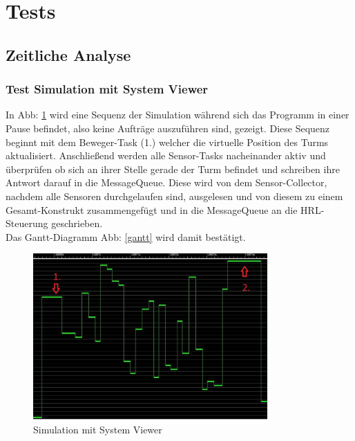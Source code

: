 \section{Tests}
\subsection{Zeitliche Analyse}
\subsubsection{Test Simulation mit System Viewer}
In Abb: \ref{fig4} wird eine Sequenz der Simulation während sich das Programm in einer Pause befindet, also keine Aufträge auszuführen sind, gezeigt. Diese Sequenz beginnt mit dem Beweger-Task (1.) welcher die virtuelle Position des Turms aktualisiert. Anschließend werden alle Sensor-Tasks nacheinander aktiv und überprüfen ob sich an ihrer Stelle gerade der Turm befindet und schreiben ihre Antwort darauf in die MessageQueue. Diese wird von dem Sensor-Collector, nachdem alle Sensoren durchgelaufen sind, ausgelesen und von diesem zu einem Gesamt-Konstrukt zusammengefügt und in die MessageQueue an die HRL-Steuerung geschrieben. \\
Das Gantt-Diagramm  Abb: \ref{gantt} wird damit bestätigt.

\begin{figure}[H]
	\centering
  \includegraphics[width=0.8\textwidth]{diagrams/simulation_erklaerung.jpg}
	\caption{Simulation mit System Viewer}
	\label{fig4}
\end{figure}
